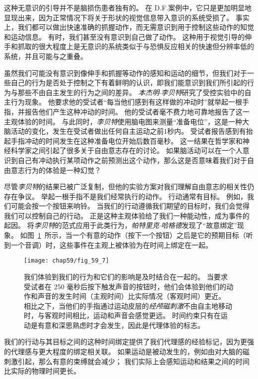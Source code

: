 这种无意识的引导并不是脑损伤患者独有的。
在 D.F.案例中，它只是更加明显地显现出来，因为正常情况下将关于形状的视觉信息带入意识的系统受损了。
事实上，我们都可以做出快速准确的抓握动作，而无需意识到用于控制这些动作的知觉和运动信息。
有时，我们甚至没有意识到自己做了动作。
这种用于视觉引导的伸手和抓取的很大程度上是无意识的系统类似于与恐惧反应相关的快速但分辨率低的系统，并且可能与之重叠。


虽然我们可能没有意识到像伸手和抓握等动作的感知和运动的细节，但我们对于一些自己的行为是否处于控制之下有着鲜明的认识，即我们能意识到我们所引起的行为与那些不由自主发生的行为之间的差异。
\textit{本杰明$\cdot$李贝特}研究了受控实验中的自主行为现象。
他要求他的受试者“每当他们感到有这样做的冲动时”就举起一根手指，并报告他们产生这种冲动的时间。
他的受试者毫不费力地可靠地报告了这一主观体验的时间。
与此同时，\textit{李贝特}使用脑电图来测量“准备电位”，这是一种大脑活动的变化，发生在受试者做出任何自主运动之前1秒内。
受试者报告感到有抬起手指冲动的时间发生在这种准备电位开始后数百毫秒。
这一结果在哲学家和神经科学家之间引起了很多关于自由意志存在的讨论。
如果脑活动可以在一个人意识到自己有冲动执行某项动作之前预测出这个动作，那么这是否意味着我们对于自由意志行为的体验是一种幻觉？


尽管\textit{李贝特}的结果已被广泛复制，但他的实验方案对我们理解自由意志的相关性仍存在争议。
举起一根手指不是我们经常执行的动作。
行动通常有目标。
例如，我们可能会按一个按钮来响铃。
当我们的行动遵循我们期望的目标时，我们会觉得我们可以控制自己的行动。
正是这种主观体验给了我们一种能动性，成为事件的起因。
将\textit{李贝特}的范式应用于此类行为，\textit{帕特里克$\cdot$哈格德}发现了“故意绑定”现象。
如图~\ref{fig:59_7}~所示，当一个有意的动作（按下一个按钮）之后是它的预期目标（听到一个音调）时，这些事件在主观上被体验为在时间上绑定在一起。


\begin{figure}[htbp]
	\centering
	\texttt{[image: chap59/fig\_59\_7]}
	\caption{我们体验到我们的行为和它们的影响是及时结合在一起的。
		当要求受试者在 250 毫秒后按下触发声音的按钮时，他们会体验到他们的动作和声音的发生时间（主观时间）比实际情况（客观时间）更近。
		相比之下，当他们的手指通过运动皮层的\textit{经颅磁刺激}不由自主地移动时，与客观时间相比，运动和声音会感觉更远。
		时间约束只有在运动是有意和深思熟虑时才会发生，因此是代理体验的标志\cite{haggard2002voluntary}。}
	\label{fig:59_7}
\end{figure}


我们的行动与其目标之间的这种时间绑定提供了我们代理感的经验标记，因为更强的代理感与更大程度的绑定相关联。
如果运动是被动发生的，例如由对大脑的磁刺激引起，那么有意的束缚就会减少；
我们实际上会感知运动和结果之间的时间比实际的物理时间更长。

